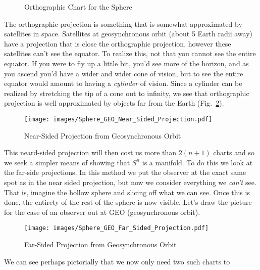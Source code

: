         \begin{figure}[H]
            \centering
            \captionsetup{type=figure}
            
            \caption{Orthographic Chart for the Sphere}
            \label{fig:Orthographic_Chart_Sphere}
        \end{figure}
        The orthographic projection is something that is somewhat approximated
        by satellites in space. Satellites at geosynchronous orbit (about
        5 Earth radii away) have a projection that is close the orthographic
        projection, however these satellites can't see the equator. To realize
        this, not that you cannot see the entire equator. If you were to fly up
        a little bit, you'd see more of the horizon, and as you ascend you'd
        have a wider and wider cone of vision, but to see the entire equator
        would amount to having a \textit{cylinder} of vision. Since a cylinder
        can be realized by stretching the tip of a cone out to infinity, we see
        that orthographic projection is well approximated by objects far from
        the Earth (Fig.~\ref{fig:GEO_Projection}).
        \begin{figure}[H]
            \centering
            \captionsetup{type=figure}
            \texttt{[image: images/Sphere\_GEO\_Near\_Sided\_Projection.pdf]}
            \caption{Near-Sided Projection from Geosynchronous Orbit}
            \label{fig:GEO_Projection}
        \end{figure}
        This neard-sided projection will then cost us more than $2(n+1)$ charts
        and so we seek a simpler means of showing that $S^{n}$ is a manifold.
        To do this we look at the far-side projections. In this method we put
        the observer at the exact same spot as in the near sided projection, but
        now we consider everything we \textit{can't} see. That is, imagine
        the hollow sphere and slicing off what we can see. Once this is done,
        the entirety of the rest of the sphere is now visible. Let's draw the
        picture for the case of an observer out at GEO (geosynchronous orbit).
        \begin{figure}[H]
            \centering
            \captionsetup{type=figure}
            \texttt{[image: images/Sphere\_GEO\_Far\_Sided\_Projection.pdf]}
            \caption{Far-Sided Projection from Geosynchronous Orbit}
            \label{fig:GEO_Far_Projection}
        \end{figure}
        We can see perhaps pictorially that we now only need two such charts to
